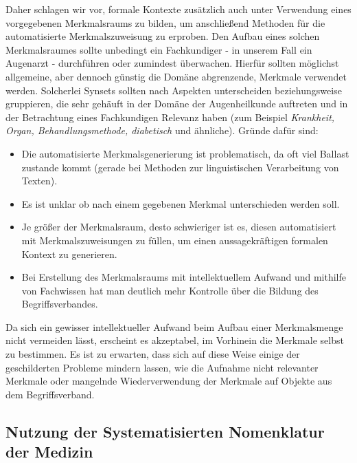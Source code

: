 \documentclass[pagesize,paper=A4,DIV=calc,fontsize=12pt,draft=false]{scrreprt}
\begin{document}
Daher schlagen wir vor, formale Kontexte zusätzlich auch unter Verwendung eines vorgegebenen Merkmalsraums zu bilden, um anschließend Methoden für die automatisierte Merkmalszuweisung zu erproben.
Den Aufbau eines solchen Merkmalsraumes sollte unbedingt ein Fachkundiger - in unserem Fall ein Augenarzt - durchführen oder zumindest überwachen. 
Hierfür sollten möglichst allgemeine, aber dennoch günstig die Domäne abgrenzende, Merkmale verwendet werden.
Solcherlei Synsets sollten nach Aspekten unterscheiden beziehungsweise gruppieren, die sehr gehäuft in der Domäne der Augenheilkunde auftreten und in der Betrachtung eines Fachkundigen Relevanz haben (zum Beispiel \emph{Krankheit, Organ, Behandlungsmethode, diabetisch} und ähnliche). 
Gründe dafür sind:
\begin{itemize}
\item Die automatisierte Merkmalsgenerierung ist problematisch, da oft viel Ballast zustande kommt (gerade bei Methoden zur linguistischen Verarbeitung von Texten).
\item Es ist unklar ob nach einem gegebenen Merkmal unterschieden werden soll.
\item Je größer der Merkmalsraum, desto schwieriger ist es, diesen automatisiert mit Merkmalszuweisungen zu füllen, um einen aussagekräftigen formalen Kontext zu generieren.
\item Bei Erstellung des Merkmalsraums mit intellektuellem Aufwand und mithilfe von Fachwissen hat man deutlich mehr Kontrolle über die Bildung des Begriffsverbandes.
\end{itemize}
Da sich ein gewisser intellektueller Aufwand beim Aufbau einer Merkmalsmenge nicht vermeiden lässt, erscheint es akzeptabel, im Vorhinein die Merkmale selbst zu bestimmen.
Es ist zu erwarten, dass sich auf diese Weise einige der geschilderten Probleme mindern lassen, wie die Aufnahme nicht relevanter Merkmale oder mangelnde Wiederverwendung der Merkmale auf Objekte aus dem Begriffsverband. 

\subsection{Nutzung der Systematisierten Nomenklatur der Medizin}
\end{document}
